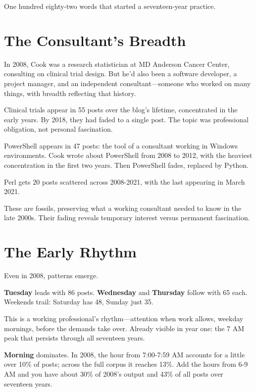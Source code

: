 One hundred eighty-two words that started a seventeen-year practice.

\bigskip

\section*{The Consultant's Breadth}

In 2008, Cook was a research statistician at MD Anderson Cancer Center, consulting on clinical trial design. But he'd also been a software developer, a project manager, and an independent consultant---someone who worked on many things, with breadth reflecting that history.

Clinical trials appear in 55 posts over the blog's lifetime, concentrated in the early years. By 2018, they had faded to a single post. The topic was professional obligation, not personal fascination.

PowerShell appears in 47 posts: the tool of a consultant working in Windows environments. Cook wrote about PowerShell from 2008 to 2012, with the heaviest concentration in the first two years. Then PowerShell fades, replaced by Python.

Perl gets 20 posts scattered across 2008-2021, with the last appearing in March 2021.

These are fossils, preserving what a working consultant needed to know in the late 2000s. Their fading reveals temporary interest versus permanent fascination.

\bigskip

\section*{The Early Rhythm}

Even in 2008, patterns emerge.

\textbf{Tuesday} leads with 86 posts. \textbf{Wednesday} and \textbf{Thursday} follow with 65 each. Weekends trail: Saturday has 48, Sunday just 35.

This is a working professional's rhythm---attention when work allows, weekday mornings, before the demands take over. Already visible in year one: the 7 AM peak that persists through all seventeen years.

\textbf{Morning} dominates. In 2008, the hour from 7:00-7:59 AM accounts for a little over 10\% of posts; across the full corpus it reaches 13\%. Add the hours from 6-9 AM and you have about 30\% of 2008's output and 43\% of all posts over seventeen years.

